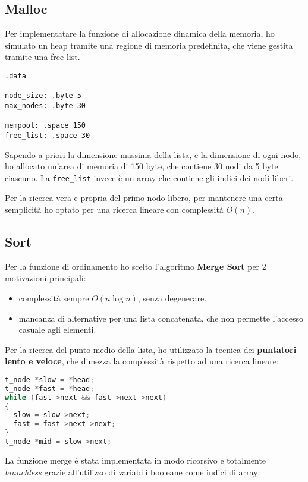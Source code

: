 \documentclass[a4paper,12pt]{article}
\begin{document}
\subsection{Malloc}

Per implementatare la funzione di allocazione dinamica della memoria, ho simulato un heap tramite una regione di memoria predefinita, che viene gestita tramite una free-list.

\begin{lstlisting}[language=riscv]
.data

node_size: .byte 5
max_nodes: .byte 30

mempool: .space 150
free_list: .space 30
\end{lstlisting}

Sapendo a priori la dimensione massima della lista, e la dimensione di ogni nodo, ho allocato un'area di memoria di 150 byte, che contiene 30 nodi da 5 byte ciascuno.
La \texttt{free\_list} invece è un array che contiene gli indici dei nodi liberi.

Per la ricerca vera e propria del primo nodo libero, per mantenere una certa semplicità ho optato per una ricerca lineare con complessità $O(n)$.

\subsection{Sort}

Per la funzione di ordinamento ho scelto l'algoritmo \textbf{Merge Sort} per 2 motivazioni principali:
\begin{itemize}
    \item complessità sempre $O(n \log n)$, senza degenerare.
    \item mancanza di alternative per una lista concatenata, che non permette l'accesso casuale agli elementi.
\end{itemize}

Per la ricerca del punto medio della lista, ho utilizzato la tecnica dei \textbf{puntatori lento e veloce}, che dimezza la complessità rispetto ad una ricerca lineare:

\begin{lstlisting}[language=C]
t_node *slow = *head;
t_node *fast = *head;
while (fast->next && fast->next->next)
{
  slow = slow->next;
  fast = fast->next->next;
}
t_node *mid = slow->next;
\end{lstlisting}

La funzione merge è stata implementata in modo ricorsivo e totalmente \emph{branchless} grazie all'utilizzo di variabili booleane come indici di array:
\end{document}

